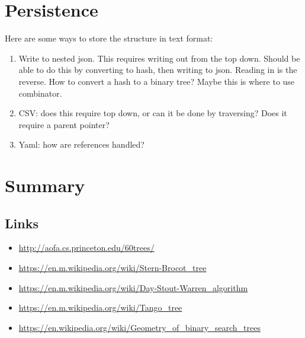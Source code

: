 \documentclass{article}
\begin{document}



\section{Persistence}

Here are some ways to store the structure in text format:

\begin{enumerate}
\item Write to nested json. This requires writing out from the top
down. Should be able to do this by converting to hash, then
writing to json. Reading in is the reverse. How to convert a
hash to a binary tree? Maybe this is where to use combinator.

\item CSV: does this require top down, or can it be done by traversing?
Does it require a parent pointer?

\item Yaml: how are references handled?
\end{enumerate}


\section{Summary}


\subsection{Links}

\begin{itemize}
\item \href{http://aofa.cs.princeton.edu/60trees/}{http://aofa.cs.princeton.edu/60trees/}
\item \href{https://en.m.wikipedia.org/wiki/Stern-Brocot\_tree}{https://en.m.wikipedia.org/wiki/Stern-Brocot\_tree}
\item \href{https://en.m.wikipedia.org/wiki/Day-Stout-Warren\_algorithm}{%
https://en.m.wikipedia.org/wiki/Day-Stout-Warren\_algorithm}
\item \href{https://en.m.wikipedia.org/wiki/Tango\_tree}{https://en.m.wikipedia.org/wiki/Tango\_tree}
\item \href{https://en.wikipedia.org/wiki/Geometry\_of\_binary\_search\_trees}{%
https://en.wikipedia.org/wiki/Geometry\_of\_binary\_search\_trees}
\end{itemize}


\end{document}
